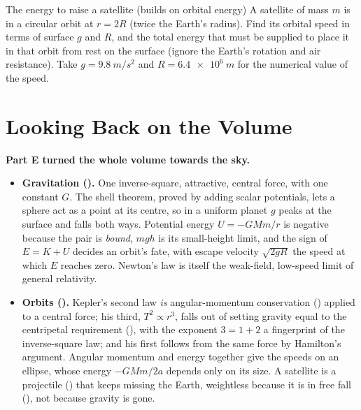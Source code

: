 \begin{challengebox}{The energy to raise a satellite (builds on orbital energy)}
A satellite of mass $m$ is in a circular orbit at $r=2R$ (twice the Earth's radius). Find its orbital
speed in terms of surface $g$ and $R$, and the total energy that must be supplied to place it in that
orbit from rest on the surface (ignore the Earth's rotation and air resistance). Take
$g=\SI{9.8}{m/s^2}$ and $R=\SI{6.4e6}{m}$ for the numerical value of the speed.
\end{challengebox}

\section*{Looking Back on the Volume}

\textbf{Part E turned the whole volume towards the sky.}
\begin{itemize}
\item \textbf{Gravitation ().} One inverse-square, attractive, central force, with one
constant $G$. The shell theorem, proved by adding scalar potentials, lets a sphere act as a
point at its centre, so in a uniform planet $g$ peaks at the surface and falls both ways. Potential energy
$U=-GMm/r$ is negative because the pair is \emph{bound}, $mgh$ is its small-height limit, and the sign of
$E=K+U$ decides an orbit's fate, with escape velocity $\sqrt{2gR}$ the speed at which $E$ reaches zero.
Newton's law is itself the weak-field, low-speed limit of general relativity.
\item \textbf{Orbits ().} Kepler's second law \emph{is} angular-momentum conservation
() applied to a central force; his third, $T^2\propto r^3$, falls out of setting gravity
equal to the centripetal requirement (), with the exponent $3=1+2$ a fingerprint of the
inverse-square law; and his first follows from the same force by Hamilton's argument. Angular momentum and
energy together give the speeds on an ellipse, whose energy $-GMm/2a$ depends only on its size. A
satellite is a projectile () that keeps missing the Earth, weightless because it is
in free fall (), not because gravity is gone.
\end{itemize}

